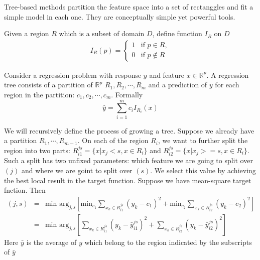 \documentclass{article}
\author{Yinan Zhu}
\begin{document}
Tree-based methods partition the feature space into a set of rectanggles and fit a simple model in each one. They are conceptually simple yet powerful tools.

Given a region $R$ which is a subset of domain $D$, define function $I_R$ on $D$ 
\begin{eqnarray}
I_R(p)= \left\{
\begin{array}{rl}
1 & \textrm{if } p \in R,\\
0 & \textrm{if } p \notin R
\end{array} \right.\nonumber
\end{eqnarray}

Consider a regression problem with response $y$ and feature $x\in \mathbb{R}^p$. A regression tree consists of a partition of $\mathbb{R}^p$ $R_1, R_2,\cdots,R_m$ and a prediction of $y$ for each region in the partition: $c_1,c_2,\cdots,c_m$. Formally
\[
\hat{y}=\sum_{i=1}^m c_iI_{R_i}(x)
\]

We will recursively define the process of growing a tree. Suppose we already have a partition $R_1,\cdots, R_{m-1}$. On each of the region $R_i$, we want to further split the region into two parts: $R_{i1}^{js}=\{x|x_j<s,x\in R_i\}$ and $R_{i2}^{js}=\{x|x_j>=s,x\in R_i\}$. Such a split has two unfixed parameters: which feature we are going to split over $(j)$ and where we are goint to split over $(s)$. We select this value by achieving the best local result in the target function. Suppose we have mean-square target fnction. Then
\begin{eqnarray}
(j,s)&=&\textrm{min arg}_{j,s}[\textrm{min}_{c_1}\sum_{x_k\in R_{i1}^{js}}(y_k-c_1)^2+\textrm{min}_{c_2}\sum_{x_k\in R_{i2}^{js}}(y_k-c_2)^2]\nonumber\\
&=&\textrm{min arg}_{j,s}[\sum_{x_k\in R_{i1}^{js}}(y_k-\bar{y}_{i1}^{js})^2+\sum_{x_k\in R_{i2}^{js}}(y_k-\bar{y}_{i2}^{js})^2]\nonumber
\end{eqnarray}
Here $\bar{y}$ is the average of $y$ which belong to the region indicated by the subscripts of $\bar{y}$
\end{document}
